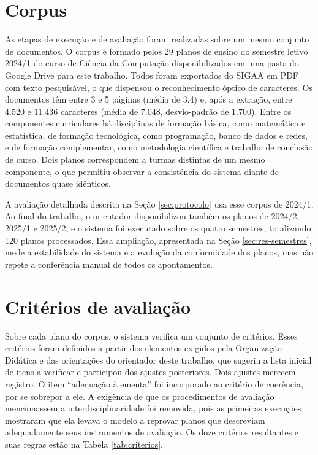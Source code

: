 \section{Corpus}
\label{sec:corpus}

As etapas de execução e de avaliação foram realizadas sobre um mesmo conjunto de documentos. O corpus é formado pelos 29 planos de ensino do semestre letivo 2024/1 do curso de Ciência da Computação disponibilizados em uma pasta do Google Drive para este trabalho. Todos foram exportados do SIGAA em PDF com texto pesquisável, o que dispensou o reconhecimento óptico de caracteres. Os documentos têm entre 3 e 5 páginas (média de 3,4) e, após a extração, entre 4.520 e 11.436 caracteres (média de 7.048, desvio-padrão de 1.700). Entre os componentes curriculares há disciplinas de formação básica, como matemática e estatística, de formação tecnológica, como programação, banco de dados e redes, e de formação complementar, como metodologia científica e trabalho de conclusão de curso. Dois planos correspondem a turmas distintas de um mesmo componente, o que permitiu observar a consistência do sistema diante de documentos quase idênticos.

A avaliação detalhada descrita na Seção \ref{sec:protocolo} usa esse corpus de 2024/1. Ao final do trabalho, o orientador disponibilizou também os planos de 2024/2, 2025/1 e 2025/2, e o sistema foi executado sobre os quatro semestres, totalizando 120 planos processados. Essa ampliação, apresentada na Seção \ref{sec:res-semestres}, mede a estabilidade do sistema e a evolução da conformidade dos planos, mas não repete a conferência manual de todos os apontamentos.

\section{Critérios de avaliação}
\label{sec:criterios}

Sobre cada plano do corpus, o sistema verifica um conjunto de critérios. Esses critérios foram definidos a partir dos elementos exigidos pela Organização Didática \cite{ifc2022} e das orientações do orientador deste trabalho, que sugeriu a lista inicial de itens a verificar e participou dos ajustes posteriores. Dois ajustes merecem registro. O item ``adequação à ementa'' foi incorporado ao critério de coerência, por se sobrepor a ele. A exigência de que os procedimentos de avaliação mencionassem a interdisciplinaridade foi removida, pois as primeiras execuções mostraram que ela levava o modelo a reprovar planos que descreviam adequadamente seus instrumentos de avaliação. Os doze critérios resultantes e suas regras estão na Tabela \ref{tab:criterios}.

